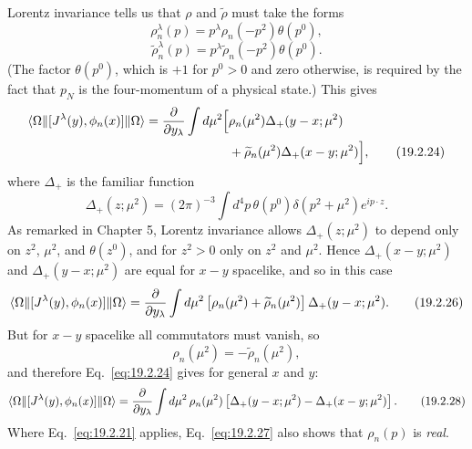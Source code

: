 Lorentz invariance tells us that $\rho$ and $\widetilde\rho$ must take the
forms
\begin{equation}
 \rho_n^\lambda(p)=p^\lambda\rho_n(-p^2)\theta(p^0),
 \tag{19.2.22}\label{eq:19.2.22}
\end{equation}
\begin{equation}
 \widetilde\rho_n^\lambda(p)
 =p^\lambda\widetilde\rho_n(-p^2)\theta(p^0).
 \tag{19.2.23}\label{eq:19.2.23}
\end{equation}
(The factor $\theta(p^0)$, which is $+1$ for $p^0>0$ and zero otherwise, is
required by the fact that $p_N$ is the four-momentum of a physical state.)
This gives
\begin{align}
 \langle \Omega\rVert[J^\lambda(y),\phi_n(x)]\lVert \Omega\rangle
 =\frac{\partial}{\partial y_\lambda}\int d\mu^2
 \Bigl[&
 \rho_n(\mu^2)\Delta_+(y-x;\mu^2)
 \notag\\
 &+\widetilde\rho_n(\mu^2)\Delta_+(x-y;\mu^2)\Bigr],
 \tag{19.2.24}\label{eq:19.2.24}
\end{align}
where $\Delta_+$ is the familiar function
\begin{equation}
 \Delta_+(z;\mu^2)=(2\pi)^{-3}\int
 d^4p\,\theta(p^0)\delta(p^2+\mu^2)e^{ip\cdot z}.
 \tag{19.2.25}\label{eq:19.2.25}
\end{equation}
As remarked in Chapter 5, Lorentz invariance allows
$\Delta_+(z;\mu^2)$ to depend only on $z^2$, $\mu^2$, and $\theta(z^0)$, and
for $z^2>0$ only on $z^2$ and $\mu^2$. Hence
$\Delta_+(x-y;\mu^2)$ and $\Delta_+(y-x;\mu^2)$ are equal for $x-y$
spacelike, and so in this case
\begin{equation}
 \langle \Omega\rVert[J^\lambda(y),\phi_n(x)]\lVert \Omega\rangle
 =\frac{\partial}{\partial y_\lambda}\int d\mu^2
 \left[\rho_n(\mu^2)+\widetilde\rho_n(\mu^2)\right]
 \Delta_+(y-x;\mu^2).
 \tag{19.2.26}\label{eq:19.2.26}
\end{equation}
But for $x-y$ spacelike all commutators must vanish, so
\begin{equation}
 \rho_n(\mu^2)=-\widetilde\rho_n(\mu^2),
 \tag{19.2.27}\label{eq:19.2.27}
\end{equation}
and therefore Eq.~\eqref{eq:19.2.24} gives for general $x$ and $y$:
\begin{equation}
 \langle \Omega\rVert[J^\lambda(y),\phi_n(x)]\lVert \Omega\rangle
 =\frac{\partial}{\partial y_\lambda}\int d\mu^2\,\rho_n(\mu^2)
 \left[\Delta_+(y-x;\mu^2)-\Delta_+(x-y;\mu^2)\right].
 \tag{19.2.28}\label{eq:19.2.28}
\end{equation}
Where Eq.~\eqref{eq:19.2.21} applies, Eq.~\eqref{eq:19.2.27} also shows that
$\rho_n(p)$ is \emph{real}.

